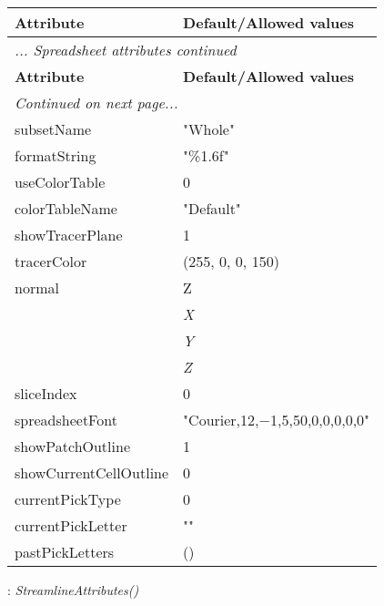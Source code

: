 \documentclass[10pt,a4paper]{report}
\begin{document}
\begin{longtable}{ll}
{\bf Attribute} & {\bf Default/Allowed values} \\
\hline \hline
\endfirsthead
\multicolumn{2}{l}{{\it ... Spreadsheet attributes continued}} \\
{\bf Attribute} & {\bf Default/Allowed values} \\
\hline \hline
\endhead
\hline
\multicolumn{2}{l}{{\it Continued on next page...}} \\
\endfoot
\hline
\endlastfoot

subsetName  &  "Whole" \\
formatString  &  "\%1.6f" \\
useColorTable  &  0 \\
colorTableName  &  "Default" \\
showTracerPlane  &  1 \\
tracerColor  &  (255, 0, 0, 150) \\
normal  &  Z   \\
 & {\it  X} \\
 & {\it  Y} \\
 & {\it  Z} \\
sliceIndex  &  0 \\
spreadsheetFont  &  "Courier,12,$-$1,5,50,0,0,0,0,0" \\
showPatchOutline  &  1 \\
showCurrentCellOutline  &  0 \\
currentPickType  &  0 \\
currentPickLetter  &  "" \\
pastPickLetters  &  () \\
\end{longtable}

\newpage

{}
: {\it StreamlineAttributes() }\\[-3mm]
\end{document}
